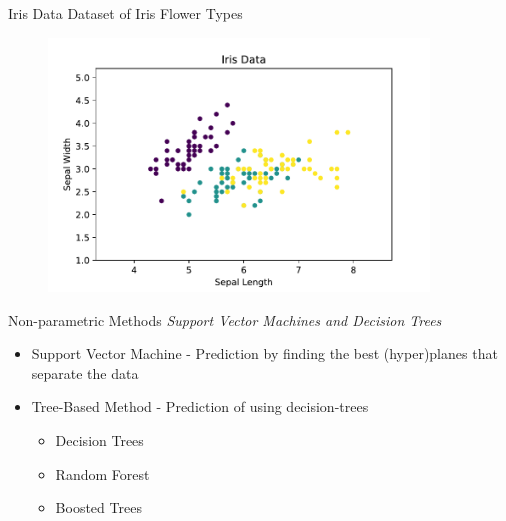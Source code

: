 \documentclass[10pt]{beamer}
\begin{document}
\begin{frame}{Iris Data}
Dataset of Iris Flower Types
	\begin{figure}	
		\includegraphics[width=0.9\textwidth, center, trim=0cm 0cm 0 0cm]{images/Iris_Data.pdf}
	\end{figure}
\end{frame}

\begin{frame}{Non-parametric Methods}
\emph{Support Vector Machines and Decision Trees}
	\begin{itemize}
		\item Support Vector Machine - Prediction by finding the best (hyper)planes that separate the data 
		\item Tree-Based Method - Prediction of using decision-trees
		\begin{itemize}
			\item Decision Trees
			\item Random Forest
			\item Boosted Trees
		\end{itemize}
	\end{itemize}
\end{frame}
\end{document}
